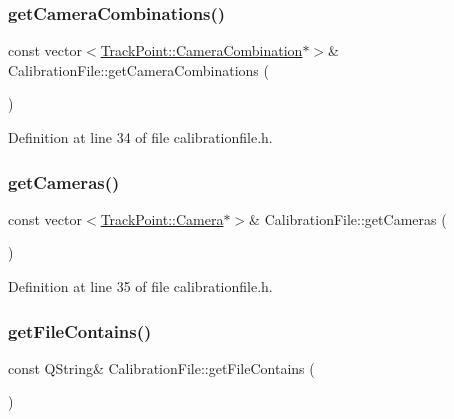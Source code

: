 \subsubsection{\texorpdfstring{getCameraCombinations()}{getCameraCombinations()}}
{\footnotesize\ttfamily const vector$<$\mbox{\hyperlink{struct_track_point_1_1_camera_combination}{Track\+Point\+::\+Camera\+Combination}}$\ast$$>$\& Calibration\+File\+::get\+Camera\+Combinations (\begin{DoxyParamCaption}{ }\end{DoxyParamCaption})\hspace{0.3cm}{\ttfamily [inline]}}



Definition at line 34 of file calibrationfile.\+h.

\mbox{\label{class_calibration_file_a58b7c9c270a2fe4148c61e2127194e8c}} 
\subsubsection{\texorpdfstring{getCameras()}{getCameras()}}
{\footnotesize\ttfamily const vector$<$\mbox{\hyperlink{struct_track_point_1_1_camera}{Track\+Point\+::\+Camera}}$\ast$$>$\& Calibration\+File\+::get\+Cameras (\begin{DoxyParamCaption}{ }\end{DoxyParamCaption})\hspace{0.3cm}{\ttfamily [inline]}}



Definition at line 35 of file calibrationfile.\+h.

\mbox{\label{class_calibration_file_a2b079fb7799837ff11c24f7463dc69b8}} 
\subsubsection{\texorpdfstring{getFileContains()}{getFileContains()}}
{\footnotesize\ttfamily const Q\+String\& Calibration\+File\+::get\+File\+Contains (\begin{DoxyParamCaption}{ }\end{DoxyParamCaption})\hspace{0.3cm}{\ttfamily [inline]}}



